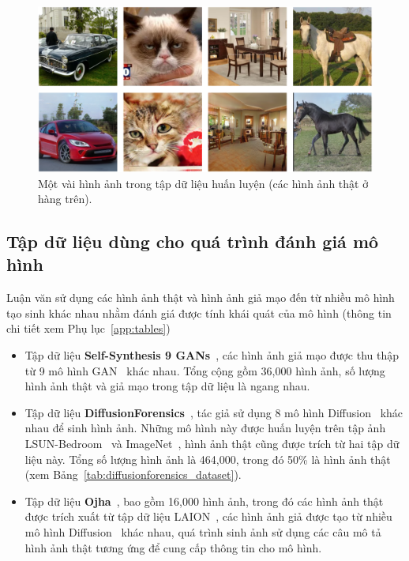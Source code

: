 %
\begin{figure}[ht!]
	\centering
	\includegraphics[width=1.0\linewidth]{Images/dataset_progan_samples.png}
	\begin{minipage}{1.0\linewidth}
		\vspace{5mm}
		\caption{Một vài hình ảnh trong tập dữ liệu huấn luyện (các hình ảnh thật ở hàng trên).}
		\label{fig:dataset_progan_samples}
	\end{minipage}
\end{figure}
%



\subsection{Tập dữ liệu dùng cho quá trình đánh giá mô hình}
Luận văn sử dụng các hình ảnh thật và hình ảnh giả mạo đến từ nhiều mô hình tạo sinh khác nhau nhằm đánh giá được tính khái quát của mô hình  (thông tin chi tiết xem Phụ lục~\ref{app:tables})
\begin{itemize}
	\item Tập dữ liệu \textbf{Self-Synthesis 9 GANs}~\cite{Tan2023RethinkingTU}, các hình ảnh giả mạo được thu thập từ 9 mô hình GAN~\cite{Goodfellow2014GenerativeAN} khác nhau. Tổng cộng gồm 36,000 hình ảnh, số lượng hình ảnh thật và giả mạo trong tập dữ liệu là ngang nhau.
	\item Tập dữ liệu \textbf{DiffusionForensics}~\cite{Wang2023DIREFD}, tác giả sử dụng 8 mô hình Diffusion~\cite{Ho2020DenoisingDP} khác nhau để sinh hình ảnh. Những mô hình này được huấn luyện trên tập ảnh LSUN-Bedroom~\cite{Yu2015LSUNCO} và ImageNet~\cite{5206848}, hình ảnh thật cũng được trích từ hai tập dữ liệu này. Tổng số lượng hình ảnh là 464,000, trong đó 50\% là hình ảnh thật (xem Bảng~\ref{tab:diffusionforensics_dataset}).
	\item Tập dữ liệu \textbf{Ojha}~\cite{Ojha2023TowardsUF}, bao gồm 16,000 hình ảnh, trong đó các hình ảnh thật được trích xuất từ tập dữ liệu LAION~\cite{abs-2111-02114}, các hình ảnh giả được tạo từ nhiều mô hình Diffusion~\cite{Ho2020DenoisingDP} khác nhau, quá trình sinh ảnh sử dụng các câu mô tả hình ảnh thật tương ứng để cung cấp thông tin cho mô hình.
\end{itemize}

